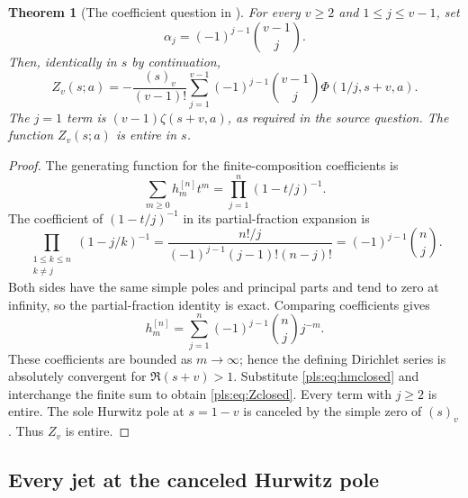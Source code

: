\documentclass[11pt,letterpaper]{article}
\numberwithin{equation}{section}
\newtheorem{theorem}{Theorem}[section]
\theoremstyle{definition}
\theoremstyle{remark}\newtheorem{remark}[theorem]{Remark}
\begin{document}
\begin{theorem}[The coefficient question in \cite{PPS}]
\label{pls:thm:alphas}
For every $v\ge2$ and $1\le j\le v-1$, set
\begin{equation}\label{pls:eq:alphas}
 \boxed{\alpha_j=(-1)^{j-1}\binom{v-1}{j}.}
\end{equation}
Then, identically in $s$ by continuation,
\begin{equation}\label{pls:eq:Zclosed}
 \boxed{\displaystyle
 Z_v(s;a)=-\frac{(s)_v}{(v-1)!}
           \sum_{j=1}^{v-1}(-1)^{j-1}\binom{v-1}{j}
                              \Phi(1/j,s+v,a).}
\end{equation}
The $j=1$ term is $(v-1)\zeta(s+v,a)$, as required in the
source question. The function $Z_v(s;a)$ is entire in $s$.
\end{theorem}
\begin{proof}
The generating function for the finite-composition coefficients is
\[
 \sum_{m\ge0}h_m^{[n]}t^m=\prod_{j=1}^n(1-t/j)^{-1}.
\]
The coefficient of $(1-t/j)^{-1}$ in its partial-fraction expansion is
\[
 \prod_{\substack{1\le k\le n\\k\ne j}}(1-j/k)^{-1}
   =\frac{n!/j}{(-1)^{j-1}(j-1)!(n-j)!}
   =(-1)^{j-1}\binom nj.
\]
Both sides have the same simple poles and principal parts and tend
to zero at infinity, so the partial-fraction identity is exact.
Comparing coefficients gives
\begin{equation}\label{pls:eq:hmclosed}
 h_m^{[n]}=\sum_{j=1}^n(-1)^{j-1}\binom nj j^{-m}.
\end{equation}
These coefficients are bounded as $m\to\infty$; hence the defining
Dirichlet series is absolutely convergent for $\Re(s+v)>1$.
Substitute \eqref{pls:eq:hmclosed} and interchange the finite sum to
obtain \eqref{pls:eq:Zclosed}. Every term with $j\ge2$ is entire.
The sole Hurwitz pole at $s=1-v$ is canceled by the simple zero of
$(s)_v$. Thus $Z_v$ is entire.
\end{proof}

\subsection{Every jet at the canceled Hurwitz pole}
\end{document}
